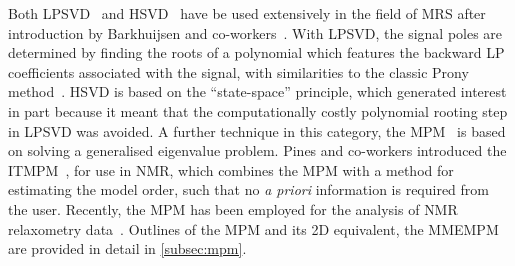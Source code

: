 Both \ac{LPSVD}~\cite{Kumaresan1982,Kumaresan1983} and
\ac{HSVD}~\cite{Kung1983} have be used extensively in the field of \ac{MRS}
after introduction by Barkhuijsen and
co-workers~\cite{Barkhuijsen1985a,Barkhuijsen1985b,Barkhuijsen1987,Beer1988,Pijnappel1992}.
With
\ac{LPSVD}, the signal poles are determined by finding the roots of a
polynomial which features the backward \ac{LP} coefficients associated with the
signal, with similarities to the classic Prony method~\cite{Prony1795}.
\ac{HSVD} is based on the ``state-space'' principle, which generated interest
in part because it meant that the computationally costly polynomial rooting
step in \ac{LPSVD} was avoided.
A further technique in this category, the
\ac{MPM}~\cite{Hua1990,Hua1990b,Hua1991} is based on solving a generalised
eigenvalue problem.  Pines and co-workers introduced the \ac{ITMPM}~\cite{Lin1997},
for use in \ac{NMR}, which combines the \ac{MPM} with a method for estimating
the model order, such that no \textit{a priori} information is required from
the user.  Recently, the \ac{MPM} has been employed for the analysis of
\ac{NMR} relaxometry data~\cite{Fricke2020, Wortge2023}.  Outlines of the
\ac{MPM} and its \ac{2D} equivalent, the \ac{MMEMPM}~\cite{Hua1992,Chen2007} are
provided in detail in \cref{subsec:mpm}.


